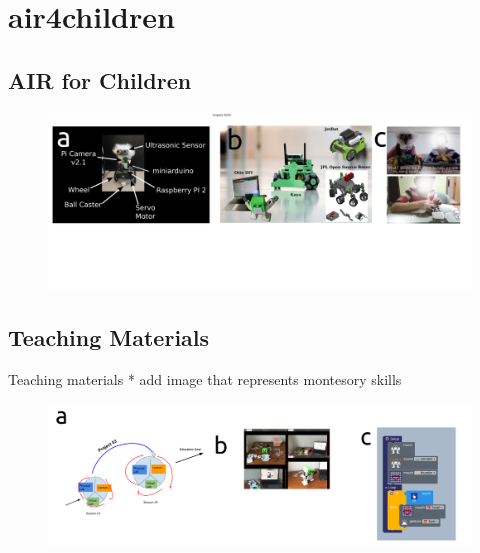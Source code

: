 \section{air4children}

\subsection{AIR for Children}

{
\begin{frame}{}
      \begin{figure}
        \centering
        \includegraphics[width=1.0\textwidth]{./figures/air4children/versions/drawing-v02.png}
      \end{figure}
\end{frame}
}

\subsection{Teaching Materials}

{
\begin{frame}{Teaching materials}
* add image that represents montesory skills
      \begin{figure}
        \centering
        \includegraphics[width=1.0\textwidth]{./figures/teaching-materials/versions/drawing-v01.png}
      \end{figure}
\end{frame}
}
